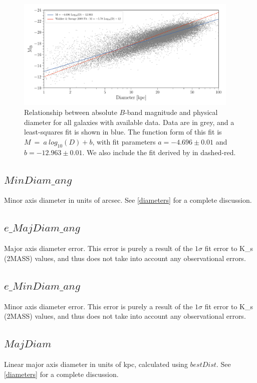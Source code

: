 \documentclass[twocolumn,tighten]{aastex62}
\begin{document}
\begin{figure}[ht!]
        \centering
        \vspace{0pt}
        \includegraphics[width=0.95\textwidth]{mag_v_diam_fit2.pdf}
        \caption{\small{Relationship between absolute $B$-band magnitude and physical diameter for all galaxies with available data. Data are in grey, and a least-squares fit is shown in blue. The function form of this fit is $M ~=~ a ~ log_{10}(D) + b$, with fit parameters $a = -4.696 \pm 0.01$ and $b = -12.963 \pm 0.01$. We also include the fit derived by \cite{wakker2009} in dashed-red.}}
        \label{magvdiam}
\end{figure}


\subsection{$MinDiam\_ang$} \label{MinDiam_ang}
Minor axis diameter in units of arcsec. See \ref{diameters} for a complete discussion.

\subsection{$e\_MajDiam\_ang$} \label{e_MinDiam_ang}
Major axis diameter error. This error is purely a result of the $1\sigma$ fit error to K\_s (2MASS) values, and thus does not take into account any observational errors.

\subsection{$e\_MinDiam\_ang$} \label{e_MinDiam_ang}
Minor axis diameter error. This error is purely a result of the $1\sigma$ fit error to K\_s (2MASS) values, and thus does not take into account any observational errors.

\subsection{$MajDiam$} \label{MajDiam}
Linear major axis diameter in units of kpc, calculated using $bestDist$. See \ref{diameters} for a complete discussion.
\end{document}
